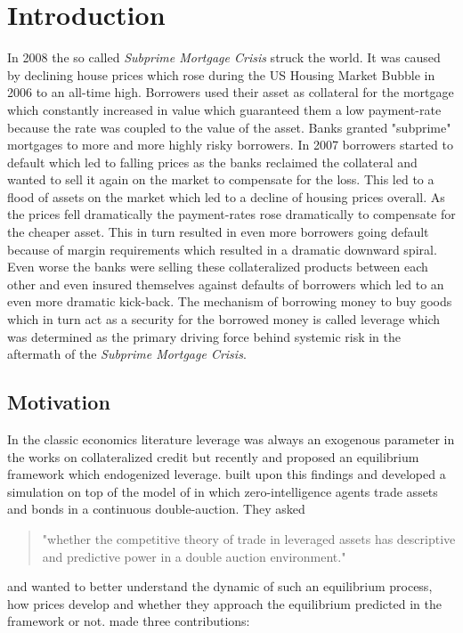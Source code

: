 \documentclass[Bachelorarbeit.tex]{subfiles}
\begin{document}
\chapter{Introduction}
In 2008 the so called \textit{Subprime Mortgage Crisis} struck the world. It was caused by declining house prices which rose during the US Housing Market Bubble in 2006 to an all-time high. Borrowers used their asset as collateral for the mortgage which constantly increased in value which guaranteed them a low payment-rate because the rate was coupled to the value of the asset. Banks granted "subprime" mortgages to more and more highly risky borrowers. In 2007 borrowers started to default which led to falling prices as the banks reclaimed the collateral and wanted to sell it again on the market to compensate for the loss. This led to a flood of assets on the market which led to a decline of housing prices overall. As the prices fell dramatically the payment-rates rose dramatically to compensate for the cheaper asset. This in turn resulted in even more borrowers going default because of margin requirements which resulted in a dramatic downward spiral. Even worse the banks were selling these collateralized products between each other and even insured themselves against defaults of borrowers which led to an even more dramatic kick-back. The mechanism of borrowing money to buy goods which in turn act as a security for the borrowed money is called leverage which was determined as the primary driving force behind systemic risk in the aftermath of the \textit{Subprime Mortgage Crisis}.

\section{Motivation}
In the classic economics literature leverage was always an exogenous parameter in the works on collateralized credit but recently \cite{Geanakoplos2009} and \cite{GeanakoplosZame2014} proposed an equilibrium framework which endogenized leverage. \cite{Breuer2015} built upon this findings and developed a simulation on top of the model of \cite{Geanakoplos2009} in which zero-intelligence agents trade assets and bonds in a continuous double-auction. They asked 

\begin{quote}
"whether the competitive theory of trade in leveraged assets has descriptive and predictive power in a double auction environment."
\end{quote}

and wanted to better understand the dynamic of such an equilibrium process, how prices develop and whether they approach the equilibrium predicted in the framework or not. \cite{Breuer2015} made three contributions:
\end{document}
